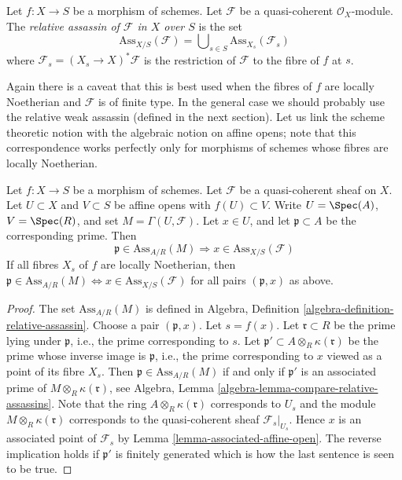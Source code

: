 \begin{definition}
\label{definition-relative-assassin}
Let $f : X \to S$ be a morphism of schemes.
Let $\mathcal{F}$ be a quasi-coherent $\mathcal{O}_X$-module.
The {\it relative assassin of $\mathcal{F}$ in $X$ over $S$}
is the set
$$
\text{Ass}_{X/S}(\mathcal{F}) =
\bigcup\nolimits_{s \in S} \text{Ass}_{X_s}(\mathcal{F}_s)
$$
where $\mathcal{F}_s = (X_s \to X)^*\mathcal{F}$ is the restriction
of $\mathcal{F}$ to the fibre of $f$ at $s$.
\end{definition}

\noindent
Again there is a caveat that this is best used when the fibres of $f$
are locally Noetherian and $\mathcal{F}$ is of finite type. In the general
case we should probably use the relative weak assassin (defined in the next
section). Let us link the scheme theoretic notion with the algebraic notion
on affine opens; note that this correspondence works perfectly only
for morphisms of schemes whose fibres are locally Noetherian.

\begin{lemma}
\label{lemma-relative-assassin-affine-open}
Let $f : X \to S$ be a morphism of schemes.
Let $\mathcal{F}$ be a quasi-coherent sheaf on $X$.
Let $U \subset X$ and $V \subset S$ be affine opens
with $f(U) \subset V$. Write $U = \Spec(A)$, $V = \Spec(R)$, and set
$M = \Gamma(U, \mathcal{F})$.
Let $x \in U$, and let $\mathfrak p \subset A$ be the corresponding prime.
Then
$$
\mathfrak p \in \text{Ass}_{A/R}(M) \Rightarrow
x \in \text{Ass}_{X/S}(\mathcal{F})
$$
If all fibres $X_s$ of $f$ are locally Noetherian, then
$\mathfrak p \in \text{Ass}_{A/R}(M) \Leftrightarrow
x \in \text{Ass}_{X/S}(\mathcal{F})$
for all pairs $(\mathfrak p, x)$ as above.
\end{lemma}

\begin{proof}
The set $\text{Ass}_{A/R}(M)$ is defined in
Algebra, Definition \ref{algebra-definition-relative-assassin}.
Choose a pair $(\mathfrak p, x)$. Let $s = f(x)$.
Let $\mathfrak r \subset R$ be the prime lying under $\mathfrak p$,
i.e., the prime corresponding to $s$.
Let $\mathfrak p' \subset A \otimes_R \kappa(\mathfrak r)$
be the prime whose inverse image is $\mathfrak p$, i.e.,
the prime corresponding to $x$ viewed as a point of its fibre $X_s$.
Then $\mathfrak p \in \text{Ass}_{A/R}(M)$ if and only if
$\mathfrak p'$ is an associated prime of
$M \otimes_R \kappa(\mathfrak r)$, see
Algebra, Lemma \ref{algebra-lemma-compare-relative-assassins}.
Note that the ring $A \otimes_R \kappa(\mathfrak r)$ corresponds to $U_s$
and the module $M \otimes_R \kappa(\mathfrak r)$ corresponds to the
quasi-coherent sheaf $\mathcal{F}_s|_{U_s}$.
Hence $x$ is an associated point of $\mathcal{F}_s$
by Lemma \ref{lemma-associated-affine-open}.
The reverse implication holds if $\mathfrak p'$ is finitely generated
which is how the last sentence is seen to be true.
\end{proof}

